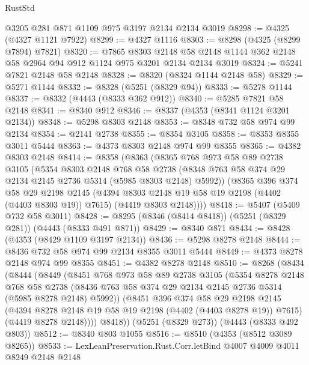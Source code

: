 \begin{lexlean}{RustStd}
\begin{coremodule}
    @3205
    @281
    @871
    @1109
    @975
    @3197
    @2134
    @2134
    @3019
@8298 := @4325 (@4327 @1121 @7922)
@8299 := @4327 @1116
@8303 := @8298 (@4325 (@8299 @7894) @7821)
@8320 := @7865
    @8303
    @2148
    @58
    @2148
    @1144
    @362
    @2148
    @58
    @2964
    @94
    @912
    @1124
    @975
    @3201
    @2134
    @2134
    @3019
@8324 := @5241 @7821 @2148 @58 @2148
@8328 := @8320 (@8324 @1144 @2148 @58)
@8329 := @5271 @1144
@8332 := @8328 (@5251 (@8329 @94))
@8333 := @5278 @1144
@8337 := @8332 (@4443 (@8333 @362 @912))
@8340 := @5285 @7821 @58 @2148
@8341 := @8340 @912
@8346 := @8337 (@4353 (@8341 @1124 @3201 @2134))
@8348 := @5298 @8303 @2148
@8353 := @8348 @732 @58 @974 @99 @2134
@8354 := @2141 @2738
@8355 := @8354 @3105
@8358 := @8353 @8355 @3011 @5444
@8363 := @4373 @8303 @2148 @974 @99 @8355
@8365 := @4382 @8303 @2148
@8414 := @8358
    (@8363
      (@8365
        @768
        @973
        @58
        @89
        @2738
        @3105
        (@5354
          @8303
          @2148
          @768
          @58
          @2738
          (@8348 @763 @58 @374 @29 @2134 @2145 @2736 @5314 (@5985 @8303 @2148) @5992))
        (@8365
          @396
          @374
          @58
          @29
          @2198
          @2145
          (@4394 @8303 @2148 @19 @58 @19 @2198 (@4402 (@4403 @8303 @19)) @7615)
          (@4419 @8303 @2148))))
@8418 := @5407 (@5409 @732 @58 @3011)
@8428 := @8295 (@8346 (@8414 @8418)) (@5251 (@8329 @281)) (@4443 (@8333 @491 @871))
@8429 := @8340 @871
@8434 := @8428 (@4353 (@8429 @1109 @3197 @2134))
@8436 := @5298 @8278 @2148
@8444 := @8436 @732 @58 @974 @99 @2134 @8355 @3011 @5444
@8449 := @4373 @8278 @2148 @974 @99 @8355
@8451 := @4382 @8278 @2148
@8510 := @8268
    (@8434
      (@8444
        (@8449
          (@8451
            @768
            @973
            @58
            @89
            @2738
            @3105
            (@5354
              @8278
              @2148
              @768
              @58
              @2738
              (@8436 @763 @58 @374 @29 @2134 @2145 @2736 @5314 (@5985 @8278 @2148) @5992))
            (@8451
              @396
              @374
              @58
              @29
              @2198
              @2145
              (@4394 @8278 @2148 @19 @58 @19 @2198 (@4402 (@4403 @8278 @19)) @7615)
              (@4419 @8278 @2148))))
        @8418))
    (@5251 (@8329 @273))
    (@4443 (@8333 @492 @803))
@8512 := @8340 @803 @1055
@8516 := @8510 (@4353 (@8512 @3089 @8265))
@8533 := LexLeanPreservation.Rust.Corr.letBind
    @4007
    @4009
    @4011
    @8249
    @2148
    @2148

\end{coremodule}
\end{lexlean}
